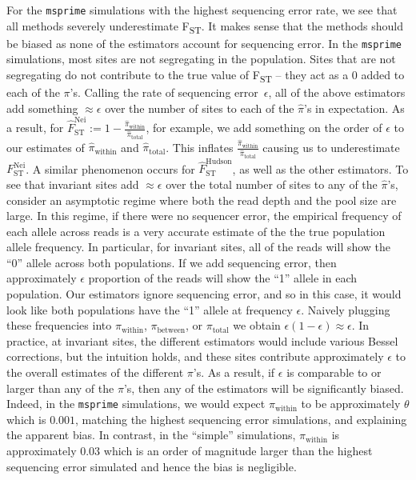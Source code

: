 \documentclass[a4paper,fontsize=9pt,DIV=14]{scrartcl}
\newcommand{\fst}{F\textsubscript{ST}}
\newcommand{\neifst}{F_\text{ST}^\text{Nei}}
\newcommand{\neiestimator}{\widehat{F}_\text{ST}^\text{Nei}}
\newcommand{\hudsonestimator}{\widehat{F}_\text{ST}^\text{Hudson}}
\begin{document}
For the \texttt{msprime} simulations with the highest sequencing error rate, we see that all methods severely underestimate \fst.  It makes sense that the methods should be biased as none of the estimators account for sequencing error. In the \texttt{msprime} simulations, most sites are not segregating in the population.  Sites that are not segregating do not contribute to the true value of \fst{} -- they act as a $0$ added to each of the $\pi$'s. Calling the rate of sequencing error~$\epsilon$, all of the above estimators add something $\approx \epsilon$ over the number of sites to each of the $\widehat{\pi}$'s in expectation.  As a result, for $\neiestimator := 1 - \frac{\widehat{\pi}_\text{within}}{\widehat{\pi}_\text{total}}$, for example, we add something on the order of $\epsilon$ to our estimates of $\widehat{\pi}_\text{within}$ and $\widehat{\pi}_\text{total}$.  This inflates $\frac{\widehat{\pi}_\text{within}}{\widehat{\pi}_\text{total}}$ causing us to underestimate $\neifst$.  A similar phenomenon occurs for $\hudsonestimator$, as well as the other estimators.  To see that invariant sites add $\approx\epsilon$ over the total number of sites to any of the $\widehat{\pi}$'s, consider an asymptotic regime where both the read depth and the pool size are large.  In this regime, if there were no sequencer error, the empirical frequency of each allele across reads is a very accurate estimate of the the true population allele frequency.  In particular, for invariant sites, all of the reads will show the ``0'' allele across both populations.  If we add sequencing error, then approximately $\epsilon$ proportion of the reads will show the ``1'' allele in each population.  Our estimators ignore sequencing error, and so in this case, it would look like both populations have the ``1'' allele at frequency $\epsilon$.  Naively plugging these frequencies into $\pi_\text{within}$, $\pi_\text{between}$, or $\pi_\text{total}$ we obtain $\epsilon(1-\epsilon)\approx \epsilon$.  In practice, at invariant sites, the different estimators would include various Bessel corrections, but the intuition holds, and these sites contribute approximately $\epsilon$ to the overall estimates of the different $\pi$'s.  As a result, if $\epsilon$ is comparable to or larger than any of the $\pi$'s, then any of the  estimators will be significantly biased.  Indeed, in the \texttt{msprime} simulations, we would expect $\pi_\text{within}$ to be approximately $\theta$ which is $0.001$, matching the highest sequencing error simulations, and explaining the apparent bias.  In contrast, in the ``simple'' simulations, $\pi_\text{within}$ is approximately $0.03$ which is an order of magnitude larger than the highest sequencing error simulated and hence the bias is negligible.
\end{document}

